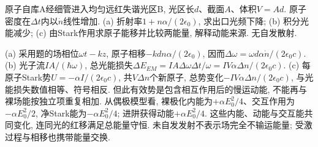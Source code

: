 \begin{exercise}原子自库A经细管进入均匀远红失谐光区B, 光区长$d$、截面$A$、体积$V=Ad$. 原子密度在$\Delta t$内以$\dot n$线性增加. (a) 折射率$1+n\alpha/(2\epsilon_0)$, 求出口光频下降; (b) 积分光能减少; (c) 由Stark作用求原子能移并比较两能量, 解释动能来源. 无自发散射.\end{exercise}
\begin{solution}(a) 采用题的场相位$\omega t-kz$, 原子相移$-kdn\alpha/(2\epsilon_0)$, 因而$\Delta\omega=\omega d\alpha\dot n/(2\epsilon_0c)$. (b) 光子流$IA/(\hbar\omega)$, 总光能损失$\Delta E_{EM}=IA\Delta\omega\Delta t/\omega=IV\alpha\Delta n/(2\epsilon_0c)$. (c) 每原子Stark势$U=-\alpha I/(2\epsilon_0c)$, 共$V\Delta n$个新原子, 总势变化$-IV\alpha\Delta n/(2\epsilon_0c)$, 与光能损失数值相等、符号相反. 但此有效势是包含相互作用后的慢运动能, 不能再与裸场能按独立项重复相加. 从偶极模型看, 裸极化内能为$+\alpha E_0^2/4$、交互作用为$-\alpha E_0^2/2$, 净Stark能为$-\alpha E_0^2/4$; 进阱获得动能$+\alpha E_0^2/4$. 这些内能、动能与交互能共同变化, 连同光的红移满足总能量守恒. 未自发发射不表示场完全不输运能量; 受激过程与相移也携带能量交换.
\end{solution}
